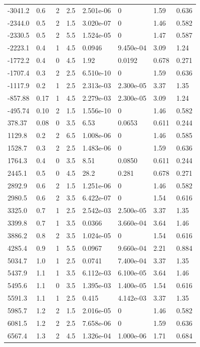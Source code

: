 \documentclass[preview]{standalone}
\begin{document}
{{\begin{tabular}{L{1.2cm}C{1.2cm} C{0.3cm}C{0.5cm} C{1.4cm}C{1.4cm} C{1.4cm}C{1.4cm}}
  -3041.2  &   0.6  & 2     & 2.5 &  2.501e-06  & 0  & 1.59 &  0.636   \\ 
  -2344.0  &   0.5  & 2     & 1.5 &  3.020e-07  & 0  & 1.46 &  0.582   \\ 
  -2330.5  &   0.5  & 2     & 5.5 &  1.524e-05  & 0  & 1.47 &  0.587   \\ 
  -2223.1  &   0.4  & 1     & 4.5 &  0.0946  & 9.450e-04  & 3.09 &  1.24   \\ 
  -1772.2  &   0.4  & 0     & 4.5 &  1.92  & 0.0192  & 0.678 &  0.271   \\ 
  -1707.4  &   0.3  & 2     & 2.5 &  6.510e-10  & 0  & 1.59 &  0.636   \\ 
  -1117.9  &   0.2  & 1     & 2.5 &  2.313e-03  & 2.300e-05  & 3.37 &  1.35   \\ 
  -857.88  &  0.17  & 1     & 4.5 &  2.279e-03  & 2.300e-05  & 3.09 &  1.24   \\ 
  -495.74  &  0.10  & 2     & 1.5 &  1.556e-10  & 0  & 1.46 &  0.582   \\ 
  378.37  &  0.08  & 0     & 3.5 &  6.53  & 0.0653  & 0.611 &  0.244   \\ 
  1129.8  &   0.2  & 2     & 6.5 &  1.008e-06  & 0  & 1.46 &  0.585   \\ 
  1528.7  &   0.3  & 2     & 2.5 &  1.483e-06  & 0  & 1.59 &  0.636   \\ 
  1764.3  &   0.4  & 0     & 3.5 &  8.51  & 0.0850  & 0.611 &  0.244   \\ 
  2445.1  &   0.5  & 0     & 4.5 &  28.2  & 0.281  & 0.678 &  0.271   \\ 
  2892.9  &   0.6  & 2     & 1.5 &  1.251e-06  & 0  & 1.46 &  0.582   \\ 
  2980.5  &   0.6  & 2     & 3.5 &  6.422e-07  & 0  & 1.54 &  0.616   \\ 
  3325.0  &   0.7  & 1     & 2.5 &  2.542e-03  & 2.500e-05  & 3.37 &  1.35   \\ 
  3399.8  &   0.7  & 1     & 3.5 &  0.0366  & 3.660e-04  & 3.64 &  1.46   \\ 
  3886.2  &   0.8  & 2     & 3.5 &  1.024e-05  & 0  & 1.54 &  0.616   \\ 
  4285.4  &   0.9  & 1     & 5.5 &  0.0967  & 9.660e-04  & 2.21 &  0.884   \\ 
  5034.7  &   1.0  & 1     & 2.5 &  0.0741  & 7.400e-04  & 3.37 &  1.35   \\ 
  5437.9  &   1.1  & 1     & 3.5 &  6.112e-03  & 6.100e-05  & 3.64 &  1.46   \\ 
  5495.6  &   1.1  & 0     & 3.5 &  1.395e-03  & 1.400e-05  & 1.54 &  0.616   \\ 
  5591.3  &   1.1  & 1     & 2.5 &  0.415  & 4.142e-03  & 3.37 &  1.35   \\ 
  5985.7  &   1.2  & 2     & 1.5 &  2.016e-05  & 0  & 1.46 &  0.582   \\ 
  6081.5  &   1.2  & 2     & 2.5 &  7.658e-06  & 0  & 1.59 &  0.636   \\ 
  6567.4  &   1.3  & 2     & 4.5 &  1.326e-04  & 1.000e-06  & 1.71 &  0.684   \\ 
\hline 
\end{tabular} 

}}
\end{document}
